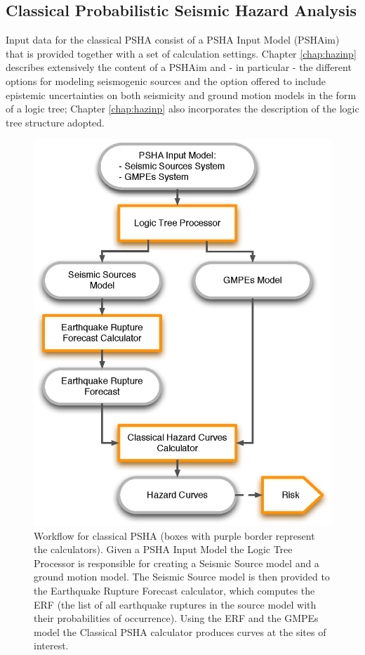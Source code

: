 \subsection{Classical Probabilistic Seismic Hazard Analysis}
\label{section:classicalPSHA}
%
Input data for the classical PSHA consist of a PSHA Input Model (PSHAim) that 
is provided together with a set of calculation settings. 
%
Chapter \ref{chap:hazinp} describes extensively the content of a PSHAim and 
- in particular - the different options for modeling seismogenic sources 
and the option offered to include epistemic uncertainties on both seismicity 
and ground motion models in the form of a logic tree; Chapter 
\ref{chap:hazinp} also incorporates the description of the logic tree 
structure adopted.
%
\begin{figure}[htbp]
\begin{center}
\includegraphics[width=12cm]{./Figures/Part_Hazard/classical_psha_workflow.eps}
\caption{Workflow for classical PSHA (boxes with purple border represent the 
calculators). Given a PSHA Input Model 
the Logic Tree Processor is responsible for creating a Seismic Source model
and a ground motion model. 
The Seismic Source model is then provided to the Earthquake Rupture Forecast 
calculator, which computes the ERF (the list of all earthquake ruptures in the 
source model with their probabilities of occurrence). 
Using the ERF and the GMPEs model the Classical PSHA calculator produces 
curves at the sites of interest.}
\label{classical_psha_workflow}
\end{center}
\end{figure}
